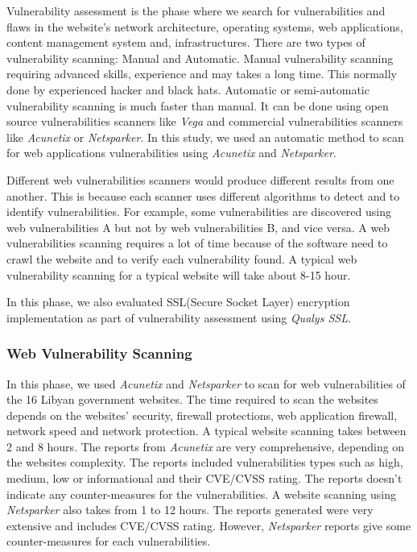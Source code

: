 \documentclass[conference]{IEEEtran}
\begin{document}
Vulnerability assessment\cite{shah2015overview} is the phase where we
search for vulnerabilities and flaws in the website’s network
architecture, operating systems, web applications, content management
system and, infrastructures. There are two types of vulnerability
scanning: Manual and Automatic.  Manual vulnerability scanning
requiring advanced skills, experience and may takes a long time. This
normally done by experienced hacker and black
hats\cite{mahmood2010moving}\cite{idris2017vulnerability}.  Automatic
or semi-automatic vulnerability scanning is much faster than
manual. It can be done using open source vulnerabilities scanners like
\emph{Vega} and commercial vulnerabilities scanners like
\emph{Acunetix} or \emph{Netsparker}.  In this study, we used an
automatic method to scan for web applications vulnerabilities using
\emph{Acunetix} and \emph{Netsparker}.



Different web vulnerabilities scanners would produce different results
from one another. This is because each scanner uses different
algorithms to detect and to identify vulnerabilities. For example,
some vulnerabilities are discovered using web vulnerabilities A but
not by web vulnerabilities B, and vice versa. A web vulnerabilities
scanning requires a lot of time because of the software need to crawl
the website and to verify each vulnerability found. A typical web
vulnerability scanning for a typical website will take about 8-15
hour.


In this phase, we also evaluated SSL(Secure Socket Layer) encryption
implementation as part of vulnerability assessment using \emph{Qualys
  SSL}.


\subsubsection{Web Vulnerability Scanning}

In this phase, we used \emph{Acunetix} and \emph{Netsparker} to scan
for web vulnerabilities of the 16 Libyan government websites. The time
required to scan the websites depends on the websites' security,
firewall protections, web application firewall, network speed and
network protection. A typical website scanning takes between 2 and 8
hours. The reports from \emph{Acunetix} are very comprehensive,
depending on the websites complexity. The reports included
vulnerabilities types such as high, medium, low or informational and
their CVE/CVSS rating. The reports doesn't indicate any
counter-measures for the vulnerabilities. A website scanning using
\emph{Netsparker} also takes from 1 to 12 hours. The reports generated
were very extensive and includes CVE/CVSS rating. However,
\emph{Netsparker} reports give some counter-measures for each
vulnerabilities.
\end{document}
